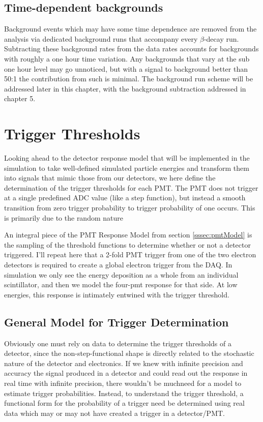 \subsection{Time-dependent backgrounds}
Background events which may have some time dependence are removed from the analysis
via dedicated background runs that accompany every $\beta$-decay run.
Subtracting these background rates from the data rates accounts for backgrounds
with roughly a one hour time variation.
Any backgrounds that vary at the sub one hour level may go unnoticed, but
with a signal to background better than 50:1 the contribution from such is minimal.
The background run scheme will be addressed later in this chapter, with the background
subtraction addressed in chapter 5. 

\section{Trigger Thresholds}

Looking ahead to the detector response model that will be implemented in the
simulation to take well-defined simulated particle energies and transform them into
signals that mimic those from our detectors, we here define the determination
of the trigger thresholds for each PMT. The PMT does not trigger at a single
predefined ADC value (like a step function), but instead a smooth transition
from zero trigger probability to trigger probability of one occurs. This is primarily
due to the random nature

An integral piece of the PMT Response Model from section \ref{sssec:pmtModel} 
is the sampling of the threshold functions to determine whether or not a detector
triggered. I'll repeat here that a 2-fold PMT trigger from one of the two electron
detectors is required to create a global electron trigger from the DAQ. In simulation
we only see the energy deposition as a whole from an individual scintillator, and then
we model the four-pmt response for that side. At low energies, this response is 
intimately entwined with the trigger threshold.

\subsection{General Model for Trigger Determination} \label{ssec:genTrigModel}
Obviously one must rely on data to determine the trigger thresholds of a detector, since
the non-step-functional shape is directly related to the stochastic nature 
of the detector and electronics. If we knew with infinite precision and 
accuracy the signal produced in a detector
and could read out the response in real time with infinite precision, 
there wouldn't be muchneed for a model to estimate trigger probabilities. 
Instead, to understand the trigger threshold, a functional 
form for the probability of a trigger need be determined using real data which may or 
may not have created a trigger in a detector/PMT. 

